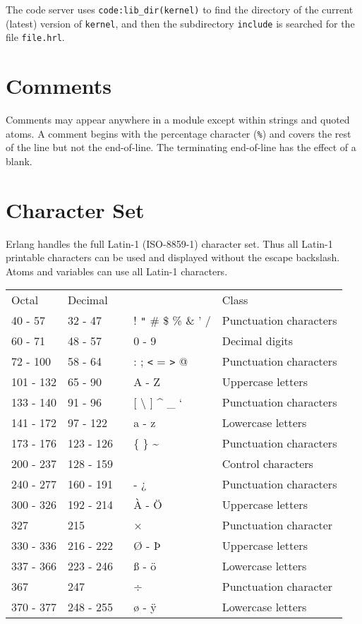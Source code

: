 The code server uses \texttt{code:lib\_dir(kernel)} to find the
directory of the current (latest) version of \texttt{kernel}, and then
the subdirectory \texttt{include} is searched for the file \texttt{file.hrl}.


\section{Comments}
Comments may appear anywhere in a module except within strings and
quoted atoms.  A comment begins with the percentage character
(\texttt{\%}) and covers the rest of the line but not the
end-of-line. The terminating end-of-line has the effect of a blank.


\section{Character Set}
Erlang handles the full Latin-1 (ISO-8859-1) character set. Thus all
Latin-1 printable characters can be used and displayed without the
escape backslash. Atoms and variables can use all Latin-1 characters.

\vspace*{12pt}
\begin{center}
\begin{tabular}{|>{\raggedright}p{52pt}|>{\raggedright}p{53pt}|>{\raggedright}p{103pt}|>{\raggedright}p{87pt}|}
\hline
\multicolumn{4}{|p{297pt}|}{Character classes}\tabularnewline
\hline
Octal & Decimal~ &   & Class\tabularnewline
\hline
40 -  57 & 32 - 47 &  ! \texttt{"} \# \$ \% \& ' / & Punctuation
characters\tabularnewline
\hline
60 -  71 & 48 - 57 & 0 - 9 & Decimal digits\tabularnewline
\hline
72 - 100 & 58 - 64 & : ; \texttt{<} = \texttt{>} @ & Punctuation characters\tabularnewline
\hline
101 - 132 &  65 - 90 & A - Z & Uppercase letters\tabularnewline
\hline
133 - 140 &  91 - 96 & [ \textbackslash{} ] \textasciicircum{} \_ ` & Punctuation
characters\tabularnewline
\hline
141 - 172 &  97 - 122 & a  -  z & Lowercase letters\tabularnewline
\hline
173 - 176 & 123 - 126 & \{ \textbar{} \} \textasciitilde{} & Punctuation characters\tabularnewline
\hline
200 - 237 & 128 - 159 ~ &   & Control characters \tabularnewline
\hline
240 - 277 & 160 - 191 & - ¿  & Punctuation characters \tabularnewline
\hline
300 - 326 & 192 - 214 & À - Ö  & Uppercase letters \tabularnewline
\hline
327  & 215 & ×  & Punctuation character \tabularnewline
\hline
330 - 336 & 216 - 222 & Ø - Þ  & Uppercase letters \tabularnewline
\hline
337 - 366 & 223 - 246 & ß - ö  & Lowercase letters \tabularnewline
\hline
367  & 247 & ÷  & Punctuation character \tabularnewline
\hline
370 - 377 & 248 - 255 & ø - ÿ  & Lowercase letters \tabularnewline
\hline
\end{tabular}
\end{center}

